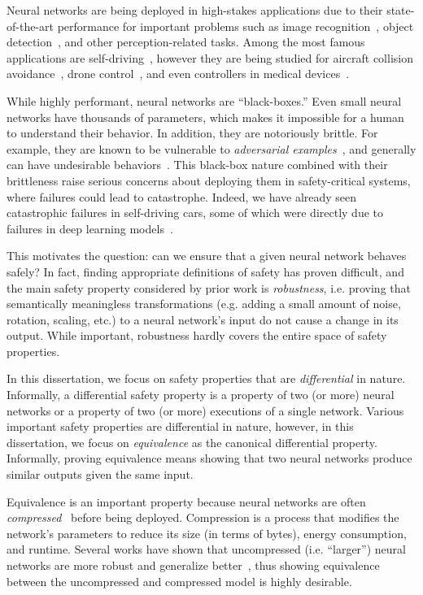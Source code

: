 Neural networks are being deployed in high-stakes applications due to their
state-of-the-art performance for important problems such as image
recognition~\cite{he2016deep}, object detection~\cite{redmon2016you}, and other
perception-related tasks. Among the most famous applications are
self-driving~\cite{grigorescu2020survey}, however they are being studied for
aircraft collision avoidance~\cite{JulianKO18}, drone control~\cite{caps2021}, and
even controllers in medical devices~\cite{tan2021toward}.

While highly performant, neural networks are ``black-boxes.'' Even small neural
networks have thousands of parameters, which makes it impossible for a human to
understand their behavior. In addition, they are notoriously brittle. For
example, they are known to be vulnerable to \textit{adversarial
examples}~\cite{szegedy2013intriguing}, and generally can have undesirable
behaviors~\cite{KatzBDJK17}. This black-box nature combined with their brittleness
raise serious concerns about deploying them in safety-critical systems, where
failures could lead to catastrophe. Indeed, we have already seen catastrophic
failures in self-driving cars, some of which were directly due to failures in deep
learning models~\cite{phil_mccausland_2019}.

This motivates the question: can we ensure that a given neural network behaves
safely? In fact, finding appropriate definitions of safety has proven difficult,
and the main safety property considered by prior work is \textit{robustness},
i.e. proving that semantically meaningless transformations (e.g. adding a small
amount of noise, rotation, scaling, etc.) to a neural network's
input do not cause a change in its output. While important, robustness hardly
covers the entire space of safety properties.

In this dissertation, we focus on safety properties that are
\textit{differential} in nature. Informally, a differential safety property
is a property of two (or more) neural networks or a property of two (or more)
executions of a single network. Various important safety
properties are differential in nature, however, in this dissertation, we focus on
\textit{equivalence} as the canonical differential property. Informally,
proving equivalence means showing that two neural networks produce similar outputs given
the same input.

Equivalence is an important property because neural networks are often
\textit{compressed}~\cite{HanMD16} before being deployed. Compression is a
process that modifies the network's parameters to reduce its size (in terms of
bytes), energy consumption, and runtime. Several works have shown that
uncompressed (i.e. ``larger'') neural networks are more robust and generalize
better~\cite{bubeck2021universal,brutzkus2019larger}, thus showing equivalence
between the uncompressed and compressed model is highly desirable.

